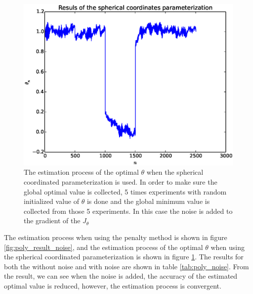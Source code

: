 \documentclass[a4paper,12pt]{article}
\begin{document}
\begin{figure}[H]
\begin{center}
\includegraphics[width=1.0\linewidth]{polynomial_est_sphe_noise.eps}


\end{center}
   \caption{The estimation process of the  optimal $\theta$ when the spherical coordinated parameterization is used. In order to make sure the global optimal value is collected, 5 times experiments with random initialized value of $\theta$ is done and the global minimum value is collected from those 5 experiments. In this case the noise is added to the gradient of the $J_{\theta}$}
\label{fig:poly_result_sphe_noise}
\end{figure}
The estimation process when using the penalty method  is shown in figure \ref{fig:poly_result_noise}, and the estimation process of the  optimal $\theta$ when using the spherical coordinated parameterization is shown in figure \ref{fig:poly_result_sphe_noise}. The results for both the without noise and with noise are shown in table \ref{tab:poly_noise}. From the result, we can see when the noise is added, the accuracy of the estimated optimal value is reduced, however, the estimation process is convergent.\\


\end{document}
